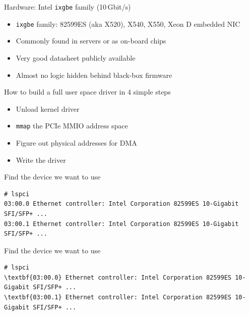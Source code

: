 \documentclass[NET,english,aspectratio=169,notitleframe]{tumbeamer}
\begin{document}
\begin{frame}{Hardware: Intel \texttt{ixgbe} family (10\,Gbit/s)}
\begin{itemize}
\item \texttt{ixgbe} family: 82599ES (aka X520), X540, X550, Xeon D embedded NIC
\item Commonly found in servers or as on-board chips
\item Very good datasheet publicly available
\item Almost no logic hidden behind black-box firmware
\end{itemize}
\end{frame}

\begin{frame}{How to build a full user space driver in 4 simple steps}
\begin{itemize}
\item[1.] Unload kernel driver
\item[2.] \texttt{mmap} the PCIe MMIO address space
\item[3.] Figure out physical addresses for DMA
\item[4.] Write the driver
\end{itemize}
\end{frame}


\begin{frame}[fragile=singleslide]{Find the device we want to use}
\begin{Verbatim}[commandchars=\\\{\}]
# lspci
03:00.0 Ethernet controller: Intel Corporation 82599ES 10-Gigabit SFI/SFP+ ...
03:00.1 Ethernet controller: Intel Corporation 82599ES 10-Gigabit SFI/SFP+ ...
\end{Verbatim}
\end{frame}

\begin{frame}[fragile=singleslide]{Find the device we want to use}
\begin{Verbatim}[commandchars=\\\{\}]
# lspci
\textbf{03:00.0} Ethernet controller: Intel Corporation 82599ES 10-Gigabit SFI/SFP+ ...
\textbf{03:00.1} Ethernet controller: Intel Corporation 82599ES 10-Gigabit SFI/SFP+ ...
\end{Verbatim}
\end{frame}
\end{document}
